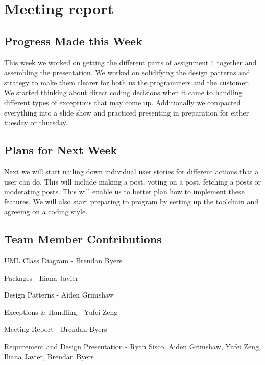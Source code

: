 \documentclass[12pt]{article}
\begin{document}
\section{Meeting report}
\subsection{Progress Made this Week}

This week we worked on getting the different parts of assignment 4 together and assembling the presentation.  We worked on solidifying the design patterns and strategy to make them clearer for both us the programmers and the customer.  We started thinking about direct coding decisions when it came to handling different types of exceptions that may come up.  Additionally we compacted everything into a slide show and practiced presenting in preparation for either tuesday or thursday.

\subsection{Plans for Next Week}

Next we will start nailing down individual user stories for different actions that a user can do.  This will include making a post, voting on a post, fetching a posts or moderating posts.  This will enable us to better plan how to implement these features.  We will also start preparing to program by setting up the toolchain and agreeing on a coding style.

\subsection{Team Member Contributions}

UML Class Diagram - Brendan Byers

Packages - Iliana Javier

Design Patterns - Aiden Grimshaw

Exceptions & Handling - Yufei Zeng

Meeting Report - Brendan Byers

Requirement and Design Presentation - Ryan Sisco, Aiden Grimshaw, Yufei Zeng, Iliana Javier, Brendan Byers 
\end{document}
